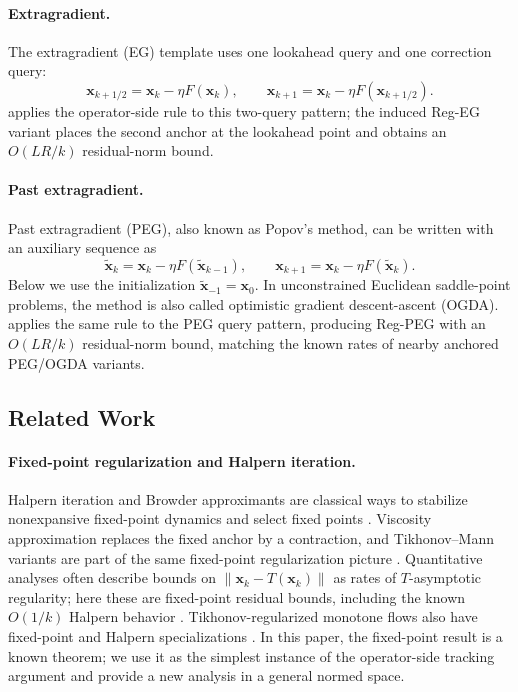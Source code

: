 \documentclass[letterpaper,11pt]{article}
\newcommand{\norm}[1]{\left\| #1 \right\|}
\newcommand{\vect}[1]{\mathbf{#1}}
\begin{document}
\paragraph{Extragradient.}
The extragradient (EG) template uses one lookahead query and one correction
query:
\begin{equation}\label{eq:eg_std}
    \vect{x}_{k+1/2}
    =
    \vect{x}_k-\eta F(\vect{x}_k),
    \qquad
    \vect{x}_{k+1}
    =
    \vect{x}_k-\eta F(\vect{x}_{k+1/2}).
\end{equation}
 applies the operator-side rule to this two-query
pattern; the induced Reg-EG variant places the second anchor at the lookahead
point and obtains an \(O(LR/k)\) residual-norm bound.

\paragraph{Past extragradient.}
Past extragradient (PEG), also known as Popov's method, can be written with an
auxiliary sequence as
\begin{equation}\label{eq:og_std}
    \tilde{\vect{x}}_k
    =
    \vect{x}_k-\eta F(\tilde{\vect{x}}_{k-1}),
    \qquad
    \vect{x}_{k+1}
    =
    \vect{x}_k-\eta F(\tilde{\vect{x}}_k).
\end{equation}
Below we use the initialization \(\tilde{\vect{x}}_{-1}=\vect{x}_0\). In
unconstrained Euclidean saddle-point problems, the method is also called
optimistic gradient descent-ascent (OGDA).
 applies the same rule to the PEG query pattern,
producing Reg-PEG with an \(O(LR/k)\) residual-norm bound, matching the known
rates of nearby anchored PEG/OGDA variants.

\subsection{Related Work}

\paragraph{Fixed-point regularization and Halpern iteration.}
Halpern iteration and Browder approximants are classical ways to stabilize
nonexpansive fixed-point dynamics and select fixed points
\cite{browder1967convergence,halpern1967fixed,wittmann1992approximation}.
Viscosity approximation replaces the fixed anchor by a contraction, and
Tikhonov--Mann variants are part of the same fixed-point regularization picture
\cite{moudafi2000viscosity,xu2004viscosity,cheval2023modified}. Quantitative
analyses often describe bounds on \(\norm{\vect{x}_k-T(\vect{x}_k)}\) as rates
of \(T\)-asymptotic regularity; here these are fixed-point residual bounds,
including the known \(O(1/k)\) Halpern behavior
\cite{leustean2007rates,kohlenbach2011quantitative,sabach2017first,lieder2021convergence,park2022exact,contreras2023optimal}.
Tikhonov-regularized monotone flows also have fixed-point and Halpern
specializations \cite{bot2024tikhonov}. In this paper, the fixed-point result
is a known theorem; we use it as the simplest instance of the operator-side
tracking argument and provide a new analysis in a general normed space.
\end{document}
